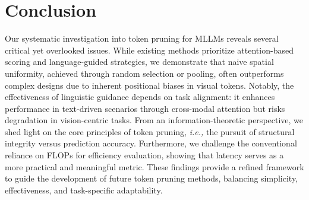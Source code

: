 \section{Conclusion}


Our systematic investigation into token pruning for MLLMs reveals several critical yet overlooked issues. While existing methods prioritize attention-based scoring and language-guided strategies, we demonstrate that naive spatial uniformity, achieved through random selection or pooling, often outperforms complex designs due to inherent positional biases in visual tokens. Notably, the effectiveness of linguistic guidance depends on task alignment: it enhances performance in text-driven scenarios through cross-modal attention but risks degradation in vision-centric tasks. 
From an information-theoretic perspective, we shed light on the core principles of token pruning, \emph{i.e.,} the pursuit of structural integrity versus prediction accuracy. Furthermore, we challenge the conventional reliance on FLOPs for efficiency evaluation, showing that latency serves as a more practical and meaningful metric. 
These findings provide a refined framework to guide the development of future token pruning methods, balancing simplicity, effectiveness, and task-specific adaptability.